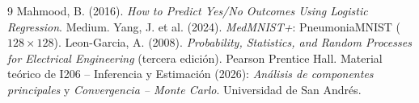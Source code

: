 \documentclass[11pt,a4paper]{article}
\begin{document}
{\small
\begin{thebibliography}{9}
 Mahmood, B. (2016). \emph{How to Predict Yes/No Outcomes Using Logistic Regression}.
  Medium.
 Yang, J. et al. (2024). \emph{MedMNIST+}: PneumoniaMNIST ($128\times128$).
 Leon-Garcia, A. (2008). \emph{Probability, Statistics, and Random Processes for
  Electrical Engineering} (tercera edición). Pearson Prentice Hall.
 Material teórico de I206 -- Inferencia y Estimación (2026): \emph{Análisis de componentes
  principales} y \emph{Convergencia -- Monte Carlo}. Universidad de San Andrés.
\end{thebibliography}
}
\end{document}
